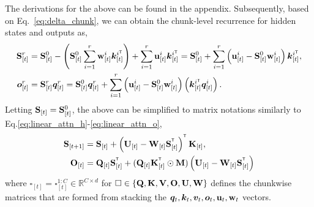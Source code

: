 The derivations for the above can be found in the appendix. Subsequently, based on Eq.~\ref{eq:delta_chunk}, we can obtain the chunk-level recurrence for hidden states and outputs as,
\begin{align*}
    \rmS_{[t]}^r &= \rmS_{[t]}^0 - \left(\rmS_{[t]}^0 \sum_{i=1}^{r}\vw_{[t]}^i \vk_{[t]}^{i\intercal} \right)+  \sum_{i=1}^{r} \vu_{[t]}^i \vk_{[t]}^{i\intercal} = \rmS_{[t]}^0 + \sum_{i=1}^{r} \left( \vu_{[t]}^i - \rmS_{[t]}^0 \vw_{[t]}^i \right) \vk_{[t]}^{i\intercal},  \\
\vo_{[t]}^r &= \rmS_{[t]}^r \vq_{[t]}^r   
            = \rmS_{[t]}^0 \vq_{[t]}^r + \sum_{i=1}^{r} \left( \vu_{[t]}^i - \rmS_{[t]}^0 \vw_{[t]}^i\right) \left(\vk_{[t]}^{i\intercal}\vq_ {[t]}^i\right).
\end{align*}
Letting  ${\mathbf{S}}_{[t]}={\mathbf{S}}_{[t]}^0$, the above can be simplified to matrix notations similarly to Eq.\ref{eq:linear_attn_h}-\ref{eq:linear_attn_o},
\vspace{-3mm}
\begin{align}
\rmS_{[t+1]} &= \rmS_{[t]} + \left(\rmU_{[t]} -  \rmW_{[t]}\rmS_{[t]}^{\intercal}\right)^\intercal \rmK_{[t]},
\label{eq:delta_chunk_h} \\
    \rmO_{[t]} &= \rmQ_{[t]} \rmS_{[t]}^\intercal + (\rmQ_{[t]} \rmK_{[t]}^{\intercal} \odot \rmM) \left(\rmU_{[t]} - \rmW_{[t]} \rmS_{[t]}^\intercal\right)  \label{eq:delta_chunk_o}
\end{align}
where $\square_{[t]} = \square_{[t]}^{1:C} \in \mathbb{R}^{C\times d}$ for $\square \in \{{\mathbf{Q}}, {\mathbf{K}}, {\mathbf{V}}, {\mathbf{O}}, {\mathbf{U}}, {\mathbf{W}} \}$ defines the chunkwise matrices that are formed from stacking the ${\bm{q}}_t, {\bm{k}}_t, {\bm{v}}_t, {\bm{o}}_t, \mathbf{u}_t, \mathbf{w}_t$ vectors.

\vspace{-2mm}
